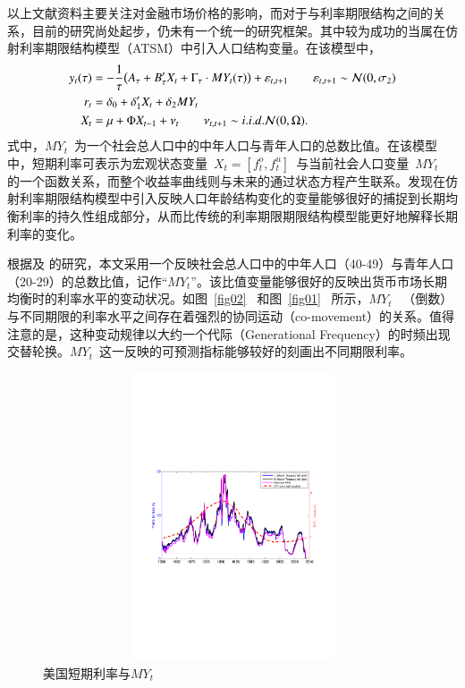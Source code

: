 以上文献资料主要关注\dsf 对金融市场价格的影响，而对于\dsf 与利率期限结构之间的关系，目前的研究尚处起步，仍未有一个统一的研究框架。其中较为成功的当属在仿射利率期限结构模型（ATSM）中引入人口结构变量。在该模型中，
\begin{align*}
  y_t(\tau) &= -\frac{1}{\tau} \big( A_{\tau} + B_{\tau}' X_t + \Gamma_{\tau} \cdot MY_t(\tau) \big) + \varepsilon_{t,t+1} \qquad \varepsilon_{t,t+1} \sim \mathcal{N}(0,\sigma_2) \\
  r_t &= \delta_0 + \delta_1' X_t + \delta_2 MY_t  \\
  X_t &= \mu + \Phi X_{t-1} + \nu_t  \qquad \nu_{t,t+1} \sim i.i.d. \mathcal{N}(0,\Omega).
\end{align*}
式中，$MY_t$~为一个社会总人口中的中年人口与青年人口的总数比值。在该模型中，短期利率可表示为宏观状态变量~$X_t=[f_t^o,f_t^u]$~与当前社会人口变量~$MY_t$~ 的一个函数关系，而整个收益率曲线则与未来的\dsf 通过状态方程产生联系。发现在仿射利率期限结构模型中引入反映人口年龄结构变化的变量能够很好的捕捉到长期均衡利率的持久性组成部分，从而比传统的利率期限期限结构模型能更好地解释长期利率的变化。

根据及 的研究，本文采用一个反映社会总人口中的中年人口（40-49）与青年人口（20-29）的总数比值，记作``$MY_t$''。该比值变量能够很好的反映出货币市场长期均衡时的利率水平的变动状况。如图~\eqref{fig02}~ 和图~\eqref{fig01}~ 所示，$MY_t$~ （倒数）与不同期限的利率水平之间存在着强烈的协同运动（co-movement）的关系。值得注意的是，这种变动规律以大约一个代际（Generational Frequency）的时频出现交替轮换。$MY_t$~这一反映\dsf 的可预测指标能够较好的刻画出不同期限利率。%

  \begin{figure}[!h]
    \includegraphics[width=15cm,height=8.5cm]{figures/fig02}
    \caption{美国短期利率与$MY_t$}    \label{fig02}
  \end{figure}

